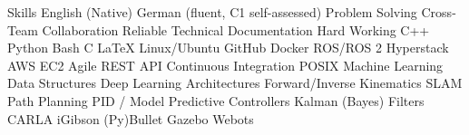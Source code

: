 
\begin{rubric}{Skills}
\entry*[Languages]
	\skilldotfirst English (Native) \skilldot German (fluent, C1 self-assessed)
\entry*[Strengths] 
	\skilldotfirst Problem Solving \skilldot Cross-Team Collaboration \skilldot Reliable \newline \skilldotfirst Technical Documentation \skilldot Hard Working %
\entry*[Coding]
	\skilldotfirst C++ \skilldot Python \skilldot Bash \skilldot C \skilldot LaTeX
\entry*[Software] 
	\skilldotfirst Linux/Ubuntu \skilldot GitHub \skilldot Docker \skilldot ROS/ROS 2 \newline \skilldotfirst Hyperstack \skilldot AWS EC2
\entry*[Knowledge] 	
	\skilldotfirst Agile \skilldot REST API \skilldot Continuous Integration \skilldot POSIX  \newline \skilldotfirst Machine Learning \skilldot Data Structures \skilldot Deep Learning Architectures
\entry*[Robotics]
	\skilldotfirst Forward/Inverse Kinematics \skilldot SLAM \skilldot Path Planning \newline \skilldotfirst PID / Model Predictive Controllers \skilldot Kalman (Bayes) Filters
\entry*[Simulators] 
	\skilldotfirst CARLA \skilldot iGibson \skilldot (Py)Bullet \skilldot Gazebo \skilldot Webots

\end{rubric}
